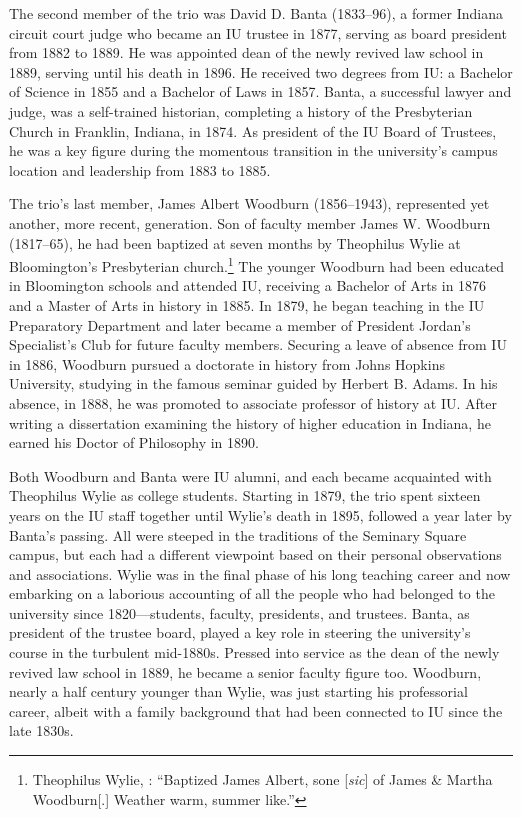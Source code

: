 \documentclass[
  american,
  letterpaper,
]{scrreprt}
\begin{document}
The second member of the trio was David D. Banta (1833--96), a former
Indiana circuit court judge who became an IU trustee in 1877, serving as
board president from 1882 to 1889. He was appointed dean of the newly
revived law school in 1889, serving until his death in 1896. He received
two degrees from IU: a Bachelor of Science in 1855 and a Bachelor of
Laws in 1857. Banta, a successful lawyer and judge, was a self-trained
historian, completing a history of the Presbyterian Church in Franklin,
Indiana, in 1874. As president of the IU Board of Trustees, he was a key
figure during the momentous transition in the university's campus
location and leadership from 1883 to 1885.

The trio's last member, James Albert Woodburn (1856--1943), represented
yet another, more recent, generation. Son of faculty member James W.
Woodburn (1817--65), he had been baptized at seven months by Theophilus
Wylie at Bloomington's Presbyterian church.\footnote{Theophilus Wylie,
  : ``Baptized James Albert, sone
  {[}\emph{sic}{]} of James \& Martha Woodburn{[}.{]} Weather warm,
  summer like.''} The younger Woodburn had been educated in Bloomington
schools and attended IU, receiving a Bachelor of Arts in 1876 and a
Master of Arts in history in 1885. In 1879, he began teaching in the IU
Preparatory Department and later became a member of President Jordan's
Specialist's Club for future faculty members. Securing a leave of
absence from IU in 1886, Woodburn pursued a doctorate in history from
Johns Hopkins University, studying in the famous seminar guided by
Herbert B. Adams. In his absence, in 1888, he was promoted to associate
professor of history at IU. After writing a dissertation examining the
history of higher education in Indiana, he earned his Doctor of
Philosophy in 1890.

Both Woodburn and Banta were IU alumni, and each became acquainted with
Theophilus Wylie as college students. Starting in 1879, the trio spent
sixteen years on the IU staff together until Wylie's death in 1895,
followed a year later by Banta's passing. All were steeped in the
traditions of the Seminary Square campus, but each had a different
viewpoint based on their personal observations and associations. Wylie
was in the final phase of his long teaching career and now embarking on
a laborious accounting of all the people who had belonged to the
university since 1820---students, faculty, presidents, and trustees.
Banta, as president of the trustee board, played a key role in steering
the university's course in the turbulent mid-1880s. Pressed into service
as the dean of the newly revived law school in 1889, he became a senior
faculty figure too. Woodburn, nearly a half century younger than Wylie,
was just starting his professorial career, albeit with a family
background that had been connected to IU since the late 1830s.
\end{document}
